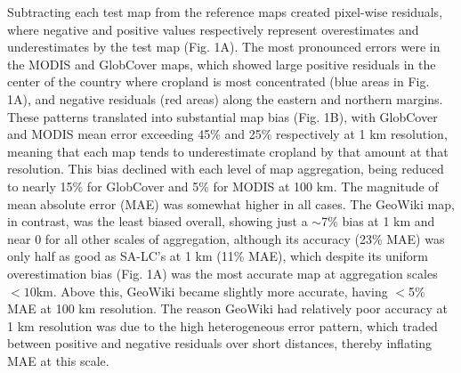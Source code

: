 \documentclass[a4paper]{article}
\begin{document}
Subtracting each test map from the reference maps created pixel-wise residuals, where negative and positive values respectively represent overestimates and underestimates by the test map (Fig. 1A). The most pronounced errors were in the MODIS and GlobCover maps, which showed large positive residuals in the center of the country where cropland is most concentrated (blue areas in Fig. 1A), and negative residuals (red areas) along the eastern and northern margins.
These patterns translated into substantial map bias (Fig. 1B), with GlobCover and MODIS mean error exceeding 45\% and 25\% respectively at 1 km resolution, meaning that each map tends to underestimate cropland by that amount at that resolution. This bias declined with each level of map aggregation, being reduced to nearly 15\% for GlobCover and 5\% for MODIS at 100 km. The magnitude of mean absolute error (MAE) was somewhat higher in all cases. The GeoWiki map, in contrast, was the least biased overall, showing just a $\sim$7\% bias at 1 km and near 0 for all other scales of aggregation, although its accuracy (23\% MAE) was only half as good as SA-LC's at 1 km (11\% MAE), which despite its uniform overestimation bias (Fig. 1A) was the most accurate map at aggregation scales $<10$km. Above this, GeoWiki became slightly more accurate, having $<$5\% MAE at 100 km resolution. The reason GeoWiki had relatively poor accuracy at 1 km resolution was due to the high heterogeneous error pattern, which traded between positive and negative residuals over short distances, thereby inflating MAE at this scale.  
\end{document}
